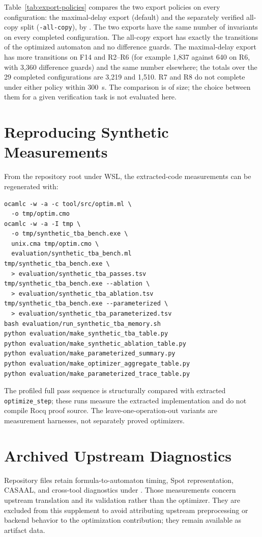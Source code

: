 \documentclass{ieeeaccess}
\begin{document}
Table~\ref{tab:export-policies} compares the two export policies on every configuration: the maximal-delay export (default) and the separately verified all-copy split (\texttt{-all-copy}), by . The two exports have the same number of invariants on every completed configuration. The all-copy export has exactly the transitions of the optimized automaton and no difference guards. The maximal-delay export has more transitions on F14 and R2--R6 (for example 1,837 against 640 on R6, with 3,360 difference guards) and the same number elsewhere; the totals over the 29 completed configurations are 3,219 and 1,510. R7 and R8 do not complete under either policy within 300~s. The comparison is of size; the choice between them for a given verification task is not evaluated here.



\section{Reproducing Synthetic Measurements}
From the repository root under WSL, the extracted-code measurements can be regenerated with:
\begingroup
\scriptsize
\begin{verbatim}
ocamlc -w -a -c tool/src/optim.ml \
  -o tmp/optim.cmo
ocamlc -w -a -I tmp \
  -o tmp/synthetic_tba_bench.exe \
  unix.cma tmp/optim.cmo \
  evaluation/synthetic_tba_bench.ml
tmp/synthetic_tba_bench.exe \
  > evaluation/synthetic_tba_passes.tsv
tmp/synthetic_tba_bench.exe --ablation \
  > evaluation/synthetic_tba_ablation.tsv
tmp/synthetic_tba_bench.exe --parameterized \
  > evaluation/synthetic_tba_parameterized.tsv
bash evaluation/run_synthetic_tba_memory.sh
python evaluation/make_synthetic_tba_table.py
python evaluation/make_synthetic_ablation_table.py
python evaluation/make_parameterized_summary.py
python evaluation/make_optimizer_aggregate_table.py
python evaluation/make_parameterized_trace_table.py
\end{verbatim}
\endgroup
The profiled full pass sequence is structurally compared with extracted \texttt{optimize\_step}; these runs measure the extracted implementation and do not compile Rocq proof source. The leave-one-operation-out variants are measurement harnesses, not separately proved optimizers.

\section{Archived Upstream Diagnostics}
Repository files retain formula-to-automaton timing, Spot representation, CASAAL, and cross-tool diagnostics under . Those measurements concern upstream translation and its validation rather than the optimizer. They are excluded from this supplement to avoid attributing upstream preprocessing or backend behavior to the optimization contribution; they remain available as artifact data.
\end{document}
